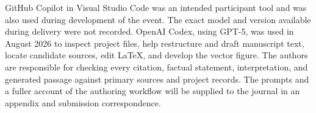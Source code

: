 \documentclass[11pt,a4paper]{article}
\begin{document}
GitHub Copilot in Visual Studio Code was an intended participant tool and was also used during development of the event. The exact model and version available during delivery were not recorded. OpenAI Codex, using GPT-5, was used in August 2026 to inspect project files, help restructure and draft manuscript text, locate candidate sources, edit LaTeX, and develop the vector figure. The authors are responsible for checking every citation, factual statement, interpretation, and generated passage against primary sources and project records. The prompts and a fuller account of the authoring workflow will be supplied to the journal in an appendix and submission correspondence.



\end{document}

